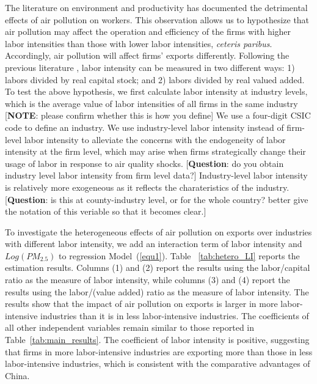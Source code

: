 \documentclass[12pt]{article}
\begin{document}
\label{sec:5.2.2} The literature on environment and productivity %
\citep[e.g.,][]{chang2016particulate,Adhvaryu2022} has documented the
detrimental effects of air pollution on workers. This observation allows us
to hypothesize that air pollution may affect the operation and efficiency of
the firms with higher labor intensities than those with lower labor
intensities, \textit{ceteris paribus}. Accordingly, air pollution will
affect firms' exports differently. Following the previous literature %
\citep{dewenter2001state}, labor intensity can be measured in two different
ways: 1) labors divided by real capital stock; and 2) labors divided by real
valued added. To test the above hypothesis, we first calculate labor
intensity at industry levels, which is the average value of labor
intensities of all firms in the same industry [\textbf{NOTE}: please confirm
whether this is how you define] We use a four-digit CSIC code to define an
industry. We use industry-level labor intensity instead of firm-level labor
intensity to alleviate the concerns with the endogeneity of labor intensity
at the firm level, which may arise when firms strategically change their
usage of labor in response to air quality shocks. [\textbf{Question}: do you
obtain industry level labor intensity from firm level data?] Industry-level
labor intensity is relatively more exogeneous as it reflects the
charateristics of the industry. [\textbf{Question}: is this at
county-industry level, or for the whole country? better give the notation of
this veriable so that it becomes clear.]

To investigate the heterogeneous effects of air pollution on exports over
industries with different labor intensity, we add an interaction term of
labor intensity and $Log(PM_{2.5})$ to regression Model~(\ref{equ1}). Table~%
\ref{tab:hetero_LI} reports the estimation results. Columns (1) and (2)
report the results using the labor/capital ratio as the measure of labor
intensity, while columns (3) and (4) report the results using the
labor/(value added) ratio as the measure of labor intensity. The results
show that the impact of air pollution on exports is larger in more
labor-intensive industries than it is in less labor-intensive industries.
The coefficients of all other independent variables remain similar to those
reported in Table~\ref{tab:main_results}. The coefficient of labor intensity
is positive, suggesting that firms in more labor-intensive industries are
exporting more than those in less labor-intensive industries, which is
consistent with the comparative advantages of China.
\end{document}
